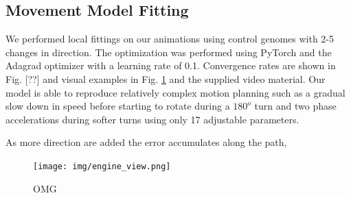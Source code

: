 
\subsection{Movement Model Fitting}
We performed local fittings on our animations using control genomes with 2-5 changes in direction. The optimization was performed using PyTorch and the Adagrad optimizer with a learning rate of 0.1. Convergence rates are shown in Fig. [??] and visual examples in Fig. \ref{fig:results:engine_view} and the supplied video material. Our model is able to reproduce relatively complex motion planning such as a gradual slow down in speed before starting to rotate during a $180^o$ turn and two phase accelerations during softer turns using only 17 adjustable parameters. 




As more direction are added the error accumulates along the path, 
\begin{figure}
    \centering
    \texttt{[image: img/engine\_view.png]}
    \caption{OMG}
    \label{fig:results:engine_view}
\end{figure}


